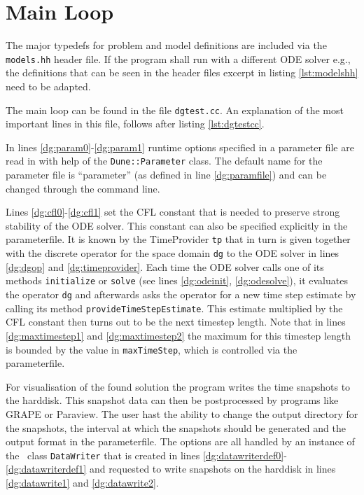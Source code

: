 \section{Main Loop} \label{se:mainloop}
%
The major typedefs for problem and model definitions are included via the
\lstinline!models.hh! header file. If the program shall run with a different
ODE solver e.g., the definitions that can be seen in the header files excerpt
in listing \ref{lst:modelshh} need to be adapted.
%
\begin{lst} \label{lst:modelshh}\mbox{}
  
\end{lst}
%
The main loop can be found in the file \lstinline!dgtest.cc!. An explanation
of the most important lines in this file, follows after listing
\ref{lst:dgtestcc}.
%
\begin{lst} \label{lst:dgtestcc}\mbox{}
  
\end{lst}
%
In lines \ref{dg:param0}-\ref{dg:param1} runtime options specified in a
parameter file are read in with help of the \lstinline!Dune::Parameter! class.
The default name for the parameter file is ``parameter'' (as defined in line
\ref{dg:paramfile}) and can be changed through the command line.

Lines \ref{dg:cfl0}-\ref{dg:cfl1} set the CFL constant that is needed to
preserve strong stability of the ODE solver. This constant can also be
specified explicitly in the parameterfile. It is known by the TimeProvider
\lstinline!tp! that in turn is given together with the discrete operator for
the space domain \lstinline!dg!  to the ODE solver in lines \ref{dg:dgop} and
\ref{dg:timeprovider}. Each time the ODE solver calls one of its methods
\lstinline!initialize! or \lstinline!solve! (see lines \ref{dg:odeinit},
\ref{dg:odesolve}), it evaluates the operator \lstinline!dg! and afterwards
asks the operator for a new time step estimate by calling its method
\lstinline!provideTimeStepEstimate!. This estimate multiplied by the CFL
constant then turns out to be the next timestep length. Note that in lines
\ref{dg:maxtimestep1} and \ref{dg:maxtimestep2} the maximum for this timestep
length is bounded by the value in \lstinline!maxTimeStep!, which is controlled
via the parameterfile.

For visualisation of the found solution the program writes the time snapshots
to the harddisk. This snapshot data can then be postprocessed by programs like
GRAPE or Paraview.  The user hast the ability to change the output directory
for the snapshots, the interval at which the snapshots should be generated and
the output format in the parameterfile. The options are all handled by an
instance of the \Fem\ class \lstinline!DataWriter! that is created in lines
\ref{dg:datawriterdef0}-\ref{dg:datawriterdef1} and requested to write
snapshots on the harddisk in lines \ref{dg:datawrite1} and \ref{dg:datawrite2}. 

